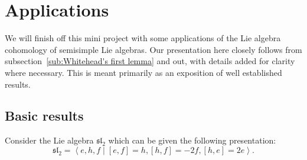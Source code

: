 \section{Applications} %
\label{sec:Computations}
We will finish off this mini project with some applications of the Lie algebra cohomology of semisimple Lie algebras. Our presentation here closely follows \cite[Section 7.8]{weibel1994homological} from subsection~\ref{sub:Whitehead's first lemma} and out, with details added for clarity where necessary. This is meant primarily as an exposition of well established results.

\subsection{Basic results} %
\label{sub:Basic results}
Consider the Lie algebra $ \mathfrak{sl}_2 $ which can be given the following presentation: $$ \mathfrak{sl}_2 = \left\langle e,h,f \mid [e,f]=h, [h,f]=-2f, [h,e] = 2e \right\rangle. $$

